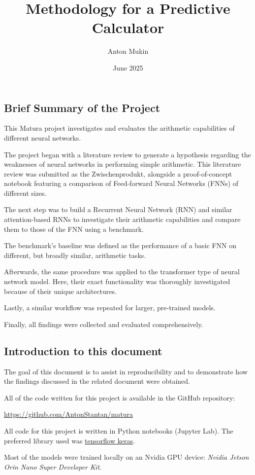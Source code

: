 \documentclass{article}
\title{Methodology for a Predictive Calculator}
\author{Anton Mukin}
\date{June 2025}
\begin{document}
\maketitle

\subsection{Brief Summary of the Project}
This Matura project investigates and evaluates the arithmetic capabilities of different neural networks.

The project began with a literature review to generate a hypothesis regarding the weaknesses of neural networks in performing simple arithmetic. This literature review was submitted as the Zwischenprodukt, alongside a proof-of-concept notebook featuring a comparison of Feed-forward Neural Networks (FNNs) of different sizes.

The next step was to build a Recurrent Neural Network (RNN) and similar attention-based RNNs to investigate their arithmetic capabilities and compare them to those of the FNN using a benchmark.

The benchmark's baseline was defined as the performance of a basic FNN on different, but broadly similar, arithmetic tasks.

Afterwards, the same procedure was applied to the transformer type of neural network model. Here, their exact functionality was thoroughly investigated because of their unique architectures.

Lastly, a similar workflow was repeated for larger, pre-trained models.

Finally, all findings were collected and evaluated comprehensively.


\subsection{Introduction to this document}
The goal of this document is to assist in reproducibility and to demonstrate how the findings discussed in the related document were obtained.

All of the code written for this project is available in the GitHub repository:

\url{https://github.com/AntonStantan/matura}

All code for this project is written in Python notebooks (Jupyter Lab). The preferred library used was \href{https://www.tensorflow.org/guide/keras}{tensorflow keras}.

Most of the models were trained locally on an Nvidia GPU device: \textit{Nvidia Jetson Orin Nano Super Developer Kit}.
\end{document}
